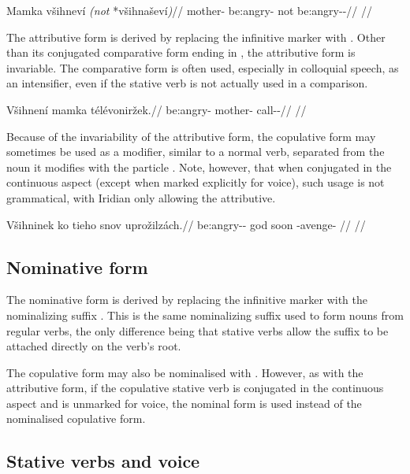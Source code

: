 \ex
\begingl
\gla Mamka všihneví \emph{(not} *všihnaševí\emph{)}//
\glb mother- be:angry- not be:angry-\Av{}-\Cont{}//
\glft {}//
\endgl
\xe


The attributive form is derived by replacing the infinitive marker  with . Other than its conjugated comparative form ending in , the attributive form is invariable. The comparative form is often used, especially in colloquial speech, as an intensifier, even if the stative verb is not actually used in a comparison.

\ex
\begingl
\gla Všihnení mamka t\'el\'evoniržek.//
\glb be:angry- mother- call-\Av{}-\Pf{}//
\glft {}//
\endgl
\xe

Because of the invariability of the attributive form, the copulative form may sometimes be used as a modifier, similar to a normal verb, separated from the noun it modifies with the particle . Note, however, that when conjugated in the continuous aspect (except when marked explicitly for voice), such usage is not grammatical, with Iridian only allowing the attributive.

\ex
\begingl
\gla Všihninek ko tieho snov uprožilzách.//
\glb be:angry-\Pv{}-\Pf{} \Att{} god soon \Refl{}-avenge- //
\glft {}//
\endgl
\xe


\subsection{Nominative form}
The nominative form is derived by replacing the infinitive marker  with the nominalizing suffix . This is the same nominalizing suffix used to form nouns from regular verbs, the only difference being that stative verbs allow the suffix to be attached directly on the verb's root.

The copulative form may also be nominalised with . However, as with the attributive form, if the copulative stative verb is conjugated in the continuous aspect and is unmarked for voice, the nominal form is used instead of the nominalised copulative form.

\subsection{Stative verbs and voice}

